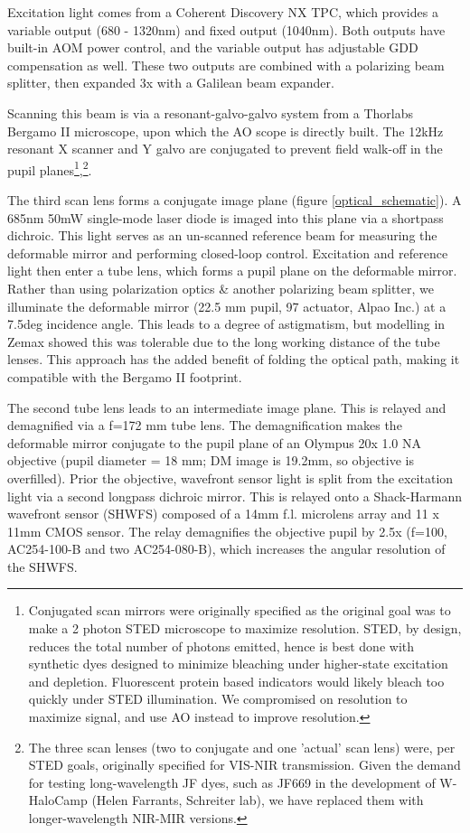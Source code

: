 \documentclass[a4paper,12pt]{article}
\begin{document}
Excitation light comes from a Coherent Discovery NX TPC, which provides a variable output (680 - 1320nm) and fixed output (1040nm).  Both outputs have built-in AOM power control, and the variable output has adjustable GDD compensation as well.  These two outputs are combined with a polarizing beam splitter, then expanded 3x with a Galilean beam expander.  

Scanning this beam is via a resonant-galvo-galvo system from a Thorlabs Bergamo II microscope, upon which the AO scope is directly built.  The 12kHz resonant X scanner and Y galvo are conjugated to prevent field walk-off in the pupil planes\footnote{Conjugated scan mirrors were originally specified as the original goal was to make a 2 photon STED microscope to maximize resolution.  STED, by design, reduces the total number of photons emitted, hence is best done with synthetic dyes designed to minimize bleaching under higher-state excitation and depletion.  Fluorescent protein based indicators would likely bleach too quickly under STED illumination.  We compromised on resolution to maximize signal, and use AO instead to improve resolution. },\footnote{The three scan lenses (two to conjugate and one 'actual' scan lens) were, per STED goals, originally specified for VIS-NIR transmission.  Given the demand for testing long-wavelength JF dyes, such as JF669 in the development of W-HaloCamp (Helen Farrants, Schreiter lab), we have replaced them with longer-wavelength NIR-MIR versions.}.  

The third scan lens forms a conjugate image plane (figure \ref{optical_schematic}).  A 685nm 50mW single-mode laser diode is imaged into this plane via a shortpass dichroic.  This light serves as an un-scanned reference beam for measuring the deformable mirror and performing closed-loop control.  Excitation and reference light then enter a tube lens, which forms a pupil plane on the deformable mirror.  Rather than using polarization optics \& another polarizing beam splitter, we illuminate the deformable mirror (22.5 mm pupil, 97 actuator, Alpao Inc.) at a 7.5deg incidence angle.  This leads to a degree of astigmatism, but modelling in Zemax showed this was tolerable due to the long working distance of the tube lenses.  This approach has the added benefit of folding the optical path, making it compatible with the Bergamo II footprint.  

The second tube lens leads to an intermediate image plane.  This is relayed and demagnified via a f=172 mm tube lens.  The demagnification makes the deformable mirror conjugate to the pupil plane of an Olympus 20x 1.0 NA objective (pupil diameter = 18 mm; DM image is 19.2mm, so objective is overfilled).  Prior the objective, wavefront sensor light is split from the excitation light via a second longpass dichroic mirror.  This is relayed onto a Shack-Harmann wavefront sensor (SHWFS) composed of a 14mm f.l. microlens array and 11 x 11mm CMOS sensor.  The relay demagnifies the objective pupil by 2.5x (f=100, AC254-100-B and two AC254-080-B), which increases the angular resolution of the SHWFS.  
\end{document}
